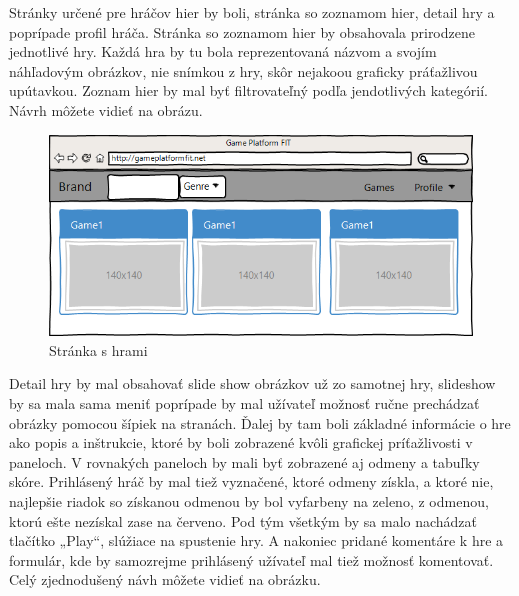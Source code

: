 Stránky určené pre hráčov hier by boli, stránka so zoznamom hier, detail hry a poprípade profil hráča. Stránka so zoznamom hier by obsahovala prirodzene jednotlivé hry. Každá hra by tu bola reprezentovaná názvom a svojím náhľadovým obrázkov, nie snímkou z hry, skôr nejakoou graficky práťažlivou upútavkou. Zoznam hier by mal byť filtrovateľný podľa jendotlivých kategórií. Návrh môžete vidieť na obrázu.
\begin{figure}[h]
  \centering
  \includegraphics[scale=0.6]{fig/gui-hry.png}
  \caption{Stránka s hrami}
  \label{fig:guihry}
\end{figure}
Detail hry by mal obsahovať slide show obrázkov už zo samotnej hry, slideshow by sa mala sama meniť poprípade by mal užívateľ možnosť ručne prechádzať obrázky pomocou šípiek na stranách. Ďalej by tam boli základné informácie o hre ako popis a inštrukcie, ktoré by boli zobrazené kvôli grafickej príťažlivosti v paneloch. V rovnakých paneloch by mali byť zobrazené aj odmeny a tabuľky skóre. Prihlásený hráč by mal tiež vyznačené, ktoré odmeny získla, a ktoré nie, najlepšie riadok so získanou odmenou by bol vyfarbeny na zeleno, z odmenou, ktorú ešte nezískal zase na červeno. Pod tým všetkým by sa malo nachádzať tlačítko „Play“, slúžiace na spustenie hry. A nakoniec pridané komentáre k hre a formulár, kde by samozrejme prihlásený užívateľ mal tiež možnosť komentovať. Celý zjednodušený návh môžete vidieť na obrázku. 
